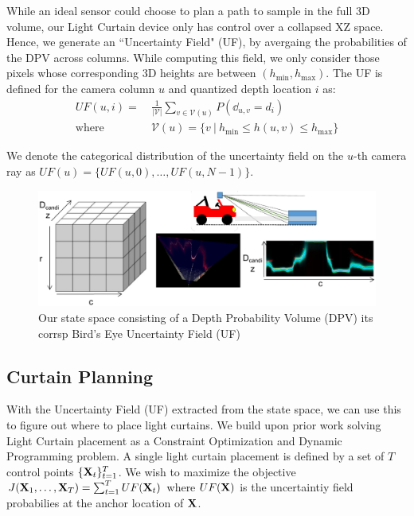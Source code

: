 While an ideal sensor could choose to plan a path to sample in the full 3D volume, our Light Curtain device only has control over a collapsed XZ  space. Hence, we generate an ``Uncertainty Field" (UF), by avergaing the probabilities of the DPV across columns. While computing this field, we only consider those pixels whose corresponding 3D heights are between $(h_\text{min}, h_\text{max})$. The UF is defined for the camera column $u$ and quantized depth location $i$ as:
\begin{align}
   UF(u, i) =\ &\frac{1}{|\mathcal{V}|}\sum_{v \in \mathcal{V}(u)} P(\dd_{u, v} = d_i)\nonumber\\
   \text{where } &\mathcal{V}(u) = \{v\ |\ h_\text{min} \leq h(u, v) \leq h_\text{max}\} 
   \label{eq:collapse}
\end{align}

We denote the categorical distribution of the uncertainty field on the $u$-th camera ray as $UF(u)= \{UF(u, 0), \dots, UF(u, N-1)\}$.

\begin{figure}[h]
   \centering
   \begin{minipage}{0.5\textwidth}
       \centering
       \includegraphics[width=1.0\textwidth]{figures/bev.pdf}
   \end{minipage}\hfill
   \centering
   \caption{Our state space consisting of a Depth Probability Volume (DPV) its corrsp Bird's Eye Uncertainty Field (UF)}
\end{figure}

\subsection{Curtain Planning}

With the Uncertainty Field (UF) extracted from the state space, we can use this to figure out where to place light curtains. We build upon prior work solving Light Curtain placement as a Constraint Optimization and Dynamic Programming problem. A single light curtain placement is defined by a set of $T$ control points $\{\mathbf{X}_t\}_{t=1}^T$. We wish to maximize the objective $J(\mathbf{X}_1, \dots, \mathbf{X}_T) = \sum_{t=1}^T UF(\mathbf{X}_t)$ where $UF(\mathbf{X})$ is the uncertaintiy field probabilies at the anchor location of $\mathbf{X}$.

